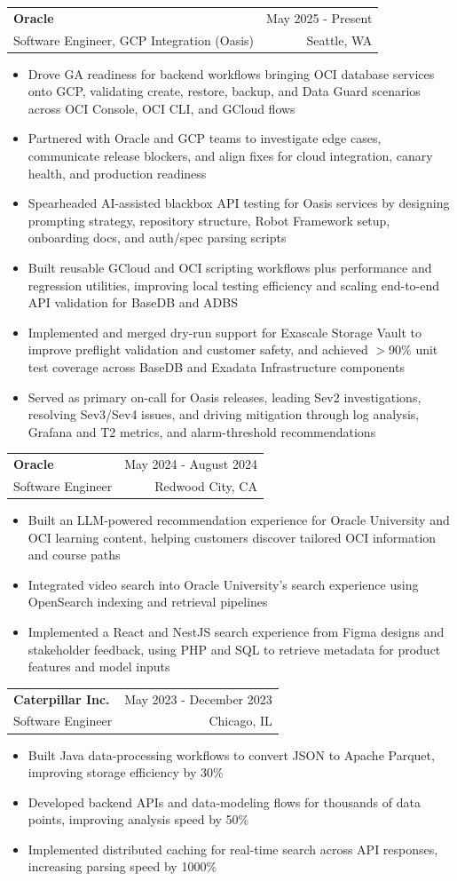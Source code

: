 \documentclass[letterpaper,11pt]{article}
\makeatletter
\newcommand{\resumeItem}[1]{
  \item\small{
    {#1 \vspace{-2pt}}
  }
}
\newcommand{\resumeSubheading}[4]{
  \vspace{-2pt}\item
    \begin{tabular*}{0.97\textwidth}[t]{l@{\extracolsep{\fill}}r}
      \textbf{#1} & #2 \\
      {\small#3} & {\small #4} \\
    \end{tabular*}\vspace{-7pt}
}
\newcommand{\resumeItemListStart}{\begin{itemize}}
\newcommand{\resumeItemListEnd}{\end{itemize}\vspace{-5pt}}
\makeatother
\begin{document}
    \resumeSubheading
  {Oracle}{May 2025 - Present}
  {Software Engineer, GCP Integration (Oasis)}{Seattle, WA}
  \resumeItemListStart
    \resumeItem{Drove GA readiness for backend workflows bringing OCI database services onto GCP, validating create, restore, backup, and Data Guard scenarios across OCI Console, OCI CLI, and GCloud flows}
    \resumeItem{Partnered with Oracle and GCP teams to investigate edge cases, communicate release blockers, and align fixes for cloud integration, canary health, and production readiness}
    \resumeItem{Spearheaded AI-assisted blackbox API testing for Oasis services by designing prompting strategy, repository structure, Robot Framework setup, onboarding docs, and auth/spec parsing scripts}
    \resumeItem{Built reusable GCloud and OCI scripting workflows plus performance and regression utilities, improving local testing efficiency and scaling end-to-end API validation for BaseDB and ADBS}
    \resumeItem{Implemented and merged dry-run support for Exascale Storage Vault to improve preflight validation and customer safety, and achieved $>$90\% unit test coverage across BaseDB and Exadata Infrastructure components}
    \resumeItem{Served as primary on-call for Oasis releases, leading Sev2 investigations, resolving Sev3/Sev4 issues, and driving mitigation through log analysis, Grafana and T2 metrics, and alarm-threshold recommendations}
  \resumeItemListEnd

    \resumeSubheading
      {Oracle}{May 2024 - August 2024}
      {Software Engineer}{Redwood City, CA}
      \resumeItemListStart
        \resumeItem{Built an LLM-powered recommendation experience for Oracle University and OCI learning content, helping customers discover tailored OCI information and course paths}
        \resumeItem{Integrated video search into Oracle University's search experience using OpenSearch indexing and retrieval pipelines}
        \resumeItem{Implemented a React and NestJS search experience from Figma designs and stakeholder feedback, using PHP and SQL to retrieve metadata for product features and model inputs}
      \resumeItemListEnd

    \resumeSubheading
      {Caterpillar Inc.}{May 2023 - December 2023}
      {Software Engineer}{Chicago, IL}
      \resumeItemListStart
        \resumeItem{Built Java data-processing workflows to convert JSON to Apache Parquet, improving storage efficiency by 30\%}
        \resumeItem{Developed backend APIs and data-modeling flows for thousands of data points, improving analysis speed by 50\%}
        \resumeItem{Implemented distributed caching for real-time search across API responses, increasing parsing speed by 1000\%}
      \resumeItemListEnd
\end{document}
